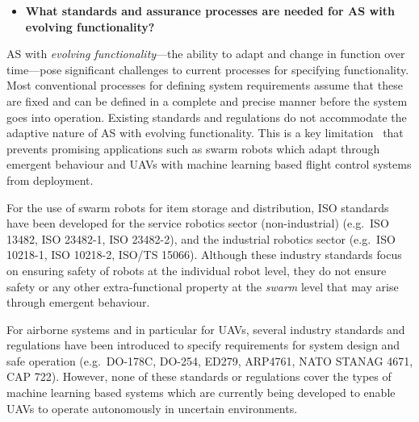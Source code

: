 \documentclass[sigconf,nonacm]{acmart}%
\begin{document}
	\begin{itemize}[leftmargin=0.5cm]
		\item \textbf{What standards and assurance processes are needed for AS with evolving functionality?}
	\end{itemize}
	AS with \emph{evolving functionality}---the ability to adapt and change in function over time---pose significant challenges to current processes for specifying functionality. 
	Most conventional processes for defining system requirements assume that these are fixed and can be defined in a complete and precise manner before the system goes into operation. 
	Existing standards and regulations do not accommodate the adaptive nature of AS with evolving functionality. This is a key limitation~\cite{Fisher2020} that prevents promising applications such as swarm robots which adapt through emergent behaviour and UAVs with machine learning based flight control systems from deployment.
	
	For the use of swarm robots for item storage and distribution, ISO standards have been developed for the service robotics sector (non-industrial) (e.g.\ ISO 13482, ISO 23482-1, ISO 23482-2), and the industrial robotics sector (e.g.\ ISO 10218-1, ISO 10218-2, ISO/TS 15066). Although these industry standards focus on ensuring safety of robots at the individual robot level, they do not ensure safety or any other extra-functional property at the \emph{swarm} level that may arise through emergent behaviour.
	
	For airborne systems and in particular for UAVs, several industry standards and regulations have been introduced to specify requirements for system design and safe operation (e.g.\ DO-178C, DO-254, ED279, ARP4761, NATO STANAG 4671, CAP 722). However, none of these standards or regulations cover the types of machine learning based systems which are currently being developed to enable UAVs to operate autonomously in uncertain environments.
	
\end{document}
